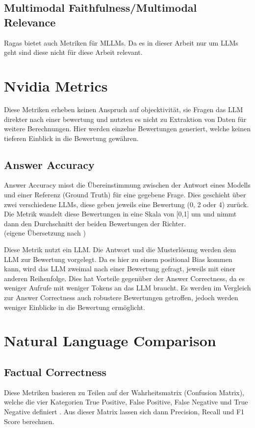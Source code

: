\subsection{Multimodal Faithfulness/Multimodal Relevance}
Ragas bietet auch Metriken für MLLMs. Da es in dieser Arbeit nur um LLMs geht sind diese nicht für diese Arbeit relevant.

\section{Nvidia Metrics}
Diese Metriken erheben keinen Anspruch auf objecktivität, sie Fragen das LLM direkter nach einer bewertung und nutzten es nicht zu Extraktion von Daten für weitere Berechnungen.
Hier werden einzelne Bewertungen generiert, welche keinen tieferen Einblick in die Bewertung gewähren.

\subsection{Answer Accuracy}
\begin{plainquote}
Answer Accuracy misst die Übereinstimmung zwischen der Antwort eines Modells und einer Referenz (Ground Truth) für eine gegebene Frage. Dies geschieht über zwei verschiedene LLMs, diese geben jeweils eine Bewertung (0, 2 oder 4) zurück. Die Metrik wandelt diese Bewertungen in eine Skala von [0,1] um und nimmt dann den Durchschnitt der beiden Bewertungen der Richter.
\\
(eigene Übersetzung nach \cite{ragas_nvidia_metrics})
\end{plainquote}

Diese Metrik nutzt ein LLM. Die Antwort und die Musterlösung werden dem LLM zur Bewertung vorgelegt. Da es hier zu einem positional Bias kommen kann, wird das LLM zweimal nach einer Bewertung gefragt, jeweils mit einer anderen Reihenfolge.
Dies hat Vorteile gegenüber der Answer Correctness, da es weniger Aufrufe mit weniger Tokens an das LLM braucht.
Es werden im Vergleich zur Answer Correctness auch robustere Bewertungen getroffen, jedoch werden weniger Einblicke in die Bewertung ermöglicht.

\section{Natural Language Comparison}

\subsection{Factual Correctness}
Diese Metriken basieren zu Teilen auf der Wahrheitsmatrix (Confusion Matrix), welche die vier Kategorien True Positive, False Positive, False Negative und True Negative definiert \cite{wikipedia_confusion_matrix}.
Aus dieser Matrix lassen sich dann Precision, Recall und F1 Score berechnen.

